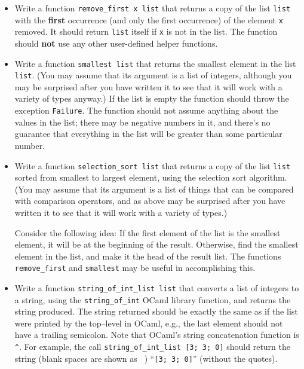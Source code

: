 \documentclass[11pt]{article}
\begin{document}
\begin{itemize}
      \item Write a function \texttt{remove\_first x list} that returns a
            copy of the list \texttt{list} with the \textbf{first}
            occurrence (and only the first occurrence) of the element
            \texttt{x} removed.  It should return \texttt{list} itself if
            \texttt{x} is not in the list.  The function should \textbf{not}
            use any other user-defined helper functions.

      \item Write a function \texttt{smallest list} that returns the
            smallest element in the list \texttt{list}.  (You may assume
            that its argument is a list of integers, although you may be
            surprised after you have written it to see that it will work with
            a variety of types anyway.)  If the list is empty the function
            should throw the exception \texttt{Failure}.  The function
            should not assume anything about the values in the list; there
            may be negative numbers in it, and there's no guarantee that
            everything in the list will be greater than some particular
            number.

      \item Write a function \texttt{selection\_sort list} that returns a
            copy of the list \texttt{list} sorted from smallest to largest
            element, using the selection sort algorithm.  (You may assume
            that its argument is a list of things that can be compared with
            comparison operators, and as above may be surprised after you
            have written it to see that it will work with a variety of
            types.)

            Consider the following idea: If the first element of the list is
            the smallest element, it will be at the beginning of the result.
            Otherwise, find the smallest element in the list, and make it
            the head of the result list.  The functions
            \texttt{remove\_first} and \texttt{smallest} may be useful
            in accomplishing this.

      \item Write a function \texttt{string\_of\_int\_list list} that
            converts a list of integers to a string, using the
            \texttt{string\_of\_int} OCaml library function, and returns the
            string produced.  The string returned should be exactly the same
            as if the list were printed by the top--level in OCaml, e.g.,
            the last element should not have a trailing semicolon.  Note
            that OCaml's string concatenation function is \texttt{\^}.  For
            example, the call \texttt{string\_of\_int\_list [3; 3; 0]}
            should return the string (blank spaces are shown as \verb*@ @)
            ``\verb*@[3; 3; 0]@'' (without the quotes).


\end{itemize}
\end{document}
